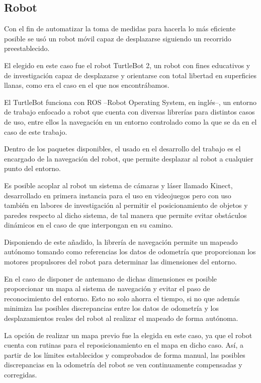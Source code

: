 \subsection{Robot}

Con el fin de automatizar la toma de medidas para hacerla lo más eficiente posible se usó un robot móvil capaz de desplazarse siguiendo un recorrido preestablecido.

El elegido en este caso fue el robot TurtleBot 2, un robot con fines educativos y de investigación capaz de desplazarse y orientarse con total libertad en superficies llanas, como era el caso en el que nos encontrábamos.

El TurtleBot funciona con ROS --Robot Operating System, en inglés--, un entorno de trabajo enfocado a robot que cuenta con diversas librerías para distintos casos de uso, entre ellos la navegación en un entorno controlado como la que se da en el caso de este trabajo.

Dentro de los paquetes disponibles, el usado en el desarrollo del trabajo es el encargado de la navegación del robot, que permite desplazar al robot a cualquier punto del entorno.

Es posible acoplar al robot un sistema de cámaras y láser llamado Kinect, desarrollado en primera instancia para el uso en videojuegos pero con uso también en labores de investigación al permitir el posicionamiento de objetos y paredes respecto al dicho sistema, de tal manera que permite evitar obstáculos dinámicos en el caso de que interpongan en su camino.

Disponiendo de este añadido, la librería de navegación permite un mapeado autónomo tomando como referencias los datos de odometría que proporcionan los motores propulsores del robot para determinar las dimensiones del entorno.

En el caso de disponer de antemano de dichas dimensiones es posible proporcionar un mapa al sistema de navegación y evitar el paso de reconocimiento del entorno.
Esto no solo ahorra el tiempo, si no que además minimiza las posibles discrepancias entre los datos de odometría y los desplazamientos reales del robot al realizar el mapeado de forma autónoma.

La opción de realizar un mapa previo fue la elegida en este caso, ya que el robot cuenta con rutinas para el reposicionamiento en el mapa en dicho caso.
Así, a partir de los límites establecidos y comprobados de forma manual, las posibles discrepancias en la odometría del robot se ven continuamente compensadas y corregidas.


